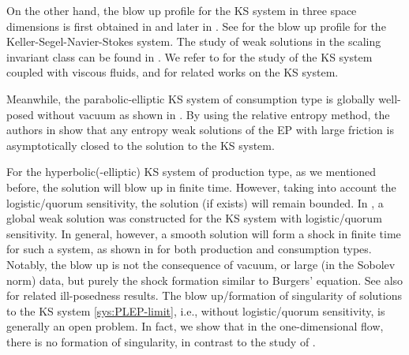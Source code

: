 \documentclass[11pt]{article}
\theoremstyle{plain}
\theoremstyle{definition}
\theoremstyle{remark}
\numberwithin{equation}{section}
\begin{document}
    On the other hand, the blow up profile for the KS system in three space dimensions is first obtained in \cite{soupletBlowupProfilesParabolic2019} and later in \cite{baiBlowupProfileKeller2025}. See \cite{liuFiniteTimeBlowup2025} for the blow up profile for the Keller-Segel-Navier-Stokes system. The study of weak solutions in the scaling invariant class can be found in \cite{kozonoExistenceUniquenessTheorem2012}. We refer to \cite{hieberStrongSolutionsKellerSegelNavierStokes2025,naGlobalWellposednessTwodimensional2024,chaeExistenceSmoothSolutions2012,winklerGlobalLargeDataSolutions2012,winklerStabilizationTwodimensionalChemotaxisNavierStokes2014,ahnGlobalClassicalSolutions2021,tanTimePeriodicStrong2021} for the study of the KS system coupled with viscous fluids, and \cite{burgerKellerSegelModel2006,iwabuchiGlobalWellposednessKeller2011,bedrossianLocalGlobalWellposedness2011,perthameTravellingPlateausHyperbolic2011,luckhausMeasureValuedSolutions2012,kiselevSuppressionChemotacticExplosion2016,takeuchiKellerSegelSystemParabolicparabolic2021,takeuchiMaximalLorentzRegularity2021,zhengGlobalClassicalSolutions2021,zhouWellposednessNonuniformDependence2021,elbarDegenerateCahnHilliardIncompressible2022,heEnhancedDissipationBlowUp2023,heIncompressibleLimitsPatlakKellerSegel2023,loanPeriodicSolutionsParabolic2024,shiEnhancedDissipationBlowup2024,takeuchiGlobalWellposednessKellerSegelNavierStokes2025,takeuchiAsymptoticBehaviorGlobal2025} for related works on the KS system.

    Meanwhile, the parabolic-elliptic KS system of consumption type is globally well-posed without vacuum as shown in \cite{gallenmullerCahnHillardKeller2024}. By using the relative entropy method, the authors in \cite{lattanzioGasDynamicsLarge2017,feireislHighFrictionLimit2024,gallenmullerCahnHillardKeller2024,elbarNonlocalEulerKortewegLocal2025} show that any entropy weak solutions of the EP with large friction is asymptotically closed to the solution to the KS system. 

    For the hyperbolic(-elliptic) KS system of production type, as we mentioned before, the solution will blow up in finite time. However, taking into account the logistic/quorum sensitivity, the solution (if exists) will remain bounded. In \cite{perthameExistenceSolutionsHyperbolic2009}, 
    a global weak solution was constructed for the KS system with logistic/quorum sensitivity. In general, however, a smooth solution will form a shock in finite time for such a system, as shown in  \cite{leeThresholdShockFormation2015,mengGlobalWellposednessBlowup2024,naFinitetimeBlowupHyperbolic2024} for both production and consumption types. Notably, the blow up is not the consequence of vacuum, or large (in the Sobolev norm) data, but purely the shock formation similar to Burgers' equation. See also \cite{zhangInitialValueProblem2022,zhouWellposednessNonuniformDependence2021,feiIllposednessHyperbolicKellerSegel2023} for related ill-posedness results. The blow up/formation of singularity of solutions to the KS system \eqref{sys:PLEP-limit}, i.e., without logistic/quorum sensitivity, is generally an open problem. In fact, we show that in the one-dimensional flow, there is no formation of singularity, in contrast to the study of \cite{leeThresholdShockFormation2015}.
\end{document}
